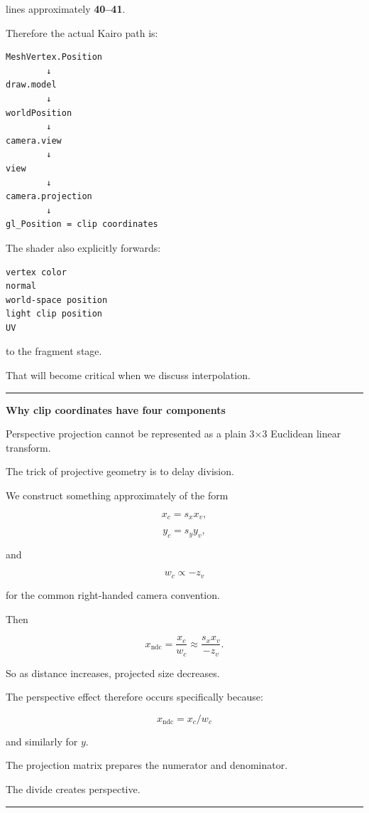 lines approximately \textbf{40--41}.

Therefore the actual Kairo path is:

\begin{verbatim}
MeshVertex.Position
        ↓
draw.model
        ↓
worldPosition
        ↓
camera.view
        ↓
view
        ↓
camera.projection
        ↓
gl_Position = clip coordinates
\end{verbatim}

The shader also explicitly forwards:

\begin{verbatim}
vertex color
normal
world-space position
light clip position
UV
\end{verbatim}

to the fragment stage.

That will become critical when we discuss interpolation.

\begin{center}\rule{0.5\linewidth}{0.5pt}\end{center}

\textbf{Why clip coordinates have four components}

Perspective projection cannot be represented as a plain 3×3 Euclidean linear transform.

The trick of projective geometry is to delay division.

We construct something approximately of the form

\[
x_c = s_xx_v,
\]

\[
y_c = s_yy_v,
\]

and

\[
w_c \propto -z_v
\]

for the common right-handed camera convention.

Then

\[
x_{\text{ndc}}
=
\frac{x_c}{w_c}
\approx
\frac{s_xx_v}{-z_v}.
\]

So as distance increases, projected size decreases.

The perspective effect therefore occurs specifically because:

\[
\boxed{x_{\text{ndc}} = x_c/w_c}
\]

and similarly for \(y\).

The projection matrix prepares the numerator and denominator.

The divide creates perspective.

\begin{center}\rule{0.5\linewidth}{0.5pt}\end{center}

